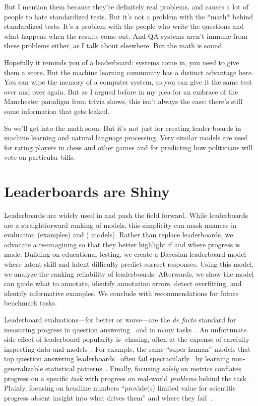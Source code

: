 But I mention them because they’re definitely real problems, and causes a lot
of people to hate standardized tests.  But it’s not a problem with the *math*
behind standardized tests.  It’s a problem with the people who write the
questions and what happens when the results come out.  And QA systems aren’t
immune from these problems either, as I talk about elsewhere.  But the math is
sound.

Hopefully it reminds you of a leaderboard: systems come in, you need to give
them a score.  But the machine learning community has a distinct advantage
here.  You can wipe the memory of a computer system, so you can give it the
same test over and over again.  But as I argued before in my plea for an
embrace of the Manchester paradigm from trivia shows, this isn’t always the
case: there’s still some information that gets leaked.


So we’ll get into the math soon.  But it's not just for creating leader boards
in machine learning and natural language processing.  Very similar models are
used for rating players in chess and other games and for predicting how
politicians will vote on particular bills.

\section{Leaderboards are Shiny}
\label{ch:isicle:intro}


Leaderboards are widely used in \nlp{} and push the field forward.  While
leaderboards are a straightforward ranking of \nlp{} models, this simplicity
can mask nuances in evaluation \itms{} (examples) and \subjs{} (\nlp{}
models).  Rather than replace leaderboards, we advocate a re-imagining so that
they better highlight if and where progress is made.  Building on educational
testing, we create a Bayesian leaderboard model where latent \subj{} skill and
latent \itm{} difficulty predict correct responses.  Using this model, we
analyze the ranking reliability of leaderboards.  Afterwards, we show the
model can guide what to annotate, identify annotation errors, detect
overfitting, and identify informative examples.  We conclude with
recommendations for future benchmark tasks.


Leaderboard evaluations---for better or worse---are the
\textit{de facto} standard for measuring progress in question
answering~\citep{squad16} and in many \nlp{}
tasks~\citep{wang2019superglue}.
An unfortunate side effect of leaderboard popularity is -chasing, often at the expense of carefully inspecting data and models~\citep{linzen2020progress}.
For example, the same  ``super-human'' models that top question answering leaderboards~\citep{najberg-18} often fail spectacularly~\citep{feng2018rawr,wallace2019universal} by learning non-generalizable statistical patterns~\citep{mccoy2019heuristics,niven2019probing}.
Finally, focusing \textit{solely} on metrics conflates progress on a specific \emph{task} with progress on real-world \nlp{} \emph{problems} behind the task~\citep{bender2020climbing}.
Plainly, focusing on headline  numbers ``provide(s) limited value for scientific progress absent insight into what drives them'' and where they fail~\citep{lipton2019troubling}.

